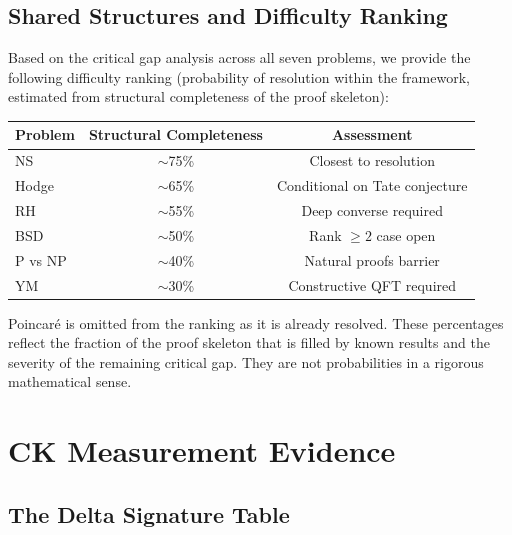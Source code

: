 \documentclass[11pt]{article}
\begin{document}
\subsection{Shared Structures and Difficulty Ranking}
\label{subsec:shared-difficulty}

Based on the critical gap analysis across all seven problems, we
provide the following difficulty ranking (probability of resolution
within the framework, estimated from structural completeness of the
proof skeleton):

\begin{center}
\begin{tabular}{@{}lcc@{}}
\toprule
Problem & Structural Completeness & Assessment \\
\midrule
NS & $\sim$75\% & Closest to resolution \\
Hodge & $\sim$65\% & Conditional on Tate conjecture \\
RH & $\sim$55\% & Deep converse required \\
BSD & $\sim$50\% & Rank $\geq 2$ case open \\
P vs NP & $\sim$40\% & Natural proofs barrier \\
YM & $\sim$30\% & Constructive QFT required \\
\bottomrule
\end{tabular}
\end{center}

\noindent
Poincar\'e is omitted from the ranking as it is already resolved.
These percentages reflect the fraction of the proof skeleton that is
filled by known results and the severity of the remaining critical gap.
They are not probabilities in a rigorous mathematical sense.

\section{CK Measurement Evidence}
\label{sec:evidence}

\subsection{The Delta Signature Table}
\label{subsec:delta-table}
\end{document}
